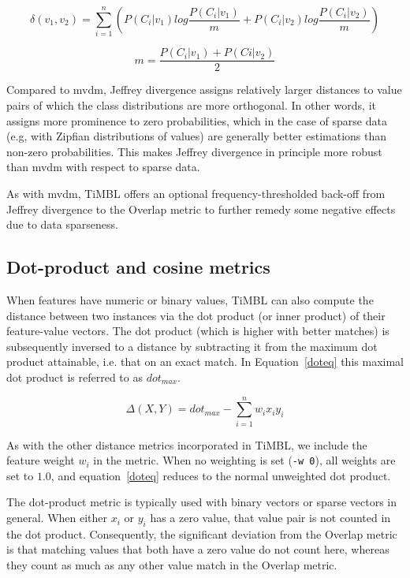 \documentclass{report}
\begin{document}
\begin{equation}
\delta(v_{1}, v_{2}) = \sum_{i=1}^{n} 
( P(C_{i}|v_{1}) log \frac{P(C_{i}|v_{1})}{m} +
  P(C_{i}|v_{2}) log \frac{P(C_{i}|v_{2})}{m} )
\label{jd}
\end{equation}

\begin{equation}
m = \frac{P(C_{i}|v_{1}) + P(C{i}|v_{2})}{2}
\label{jdm}
\end{equation}

Compared to {\sc mvdm}, Jeffrey divergence assigns relatively larger
distances to value pairs of which the class distributions are more
orthogonal. In other words, it assigns more prominence to zero
probabilities, which in the case of sparse data (e.g, with Zipfian
distributions of values) are generally better estimations than
non-zero probabilities. This makes Jeffrey divergence in principle
more robust than {\sc mvdm} with respect to sparse data.

As with {\sc mvdm}, TiMBL offers an optional frequency-thresholded
back-off from Jeffrey divergence to the Overlap metric to further
remedy some negative effects due to data sparseness.

\subsection{Dot-product and cosine metrics}
\label{dotproduct}

When features have numeric or binary values, TiMBL can also compute 
the distance between two instances via the dot product (or inner product) 
of their feature-value vectors. The dot product (which is higher with better 
matches) is subsequently inversed to a distance by subtracting it from 
the maximum dot product attainable, i.e. that on an exact match. In 
Equation~\ref{doteq} this maximal dot product is referred to as $dot_{max}$.

\begin{equation}
\label{doteq}
\Delta(X,Y) = dot_{max} - \sum_{i=1}^{n} w_{i} x_{i} y_{i}
\end{equation}

As with the other distance metrics incorporated in TiMBL, we include
the feature weight $w_{i}$ in the metric. When no weighting is set
({\tt -w 0}), all weights are set to $1.0$, and equation~\ref{doteq}
reduces to the normal unweighted dot product.

The dot-product metric is typically used with binary vectors or sparse 
vectors in general. When either $x_{i}$ or $y_{i}$ has a zero value, that 
value pair is not counted in the dot product. Consequently, the significant 
deviation from the Overlap metric is that matching values that both have a 
zero value do not count here, whereas they count as much as any other value 
match in the Overlap metric.
\end{document}
